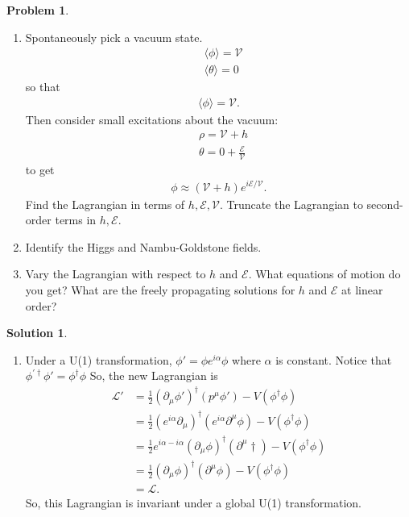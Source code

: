\documentclass[a4paper,11pt]{article}
\numberwithin{equation}{section}
\theoremstyle{definition}
\newtheorem{prob}{Problem}[section]
\newtheorem{sln}{Solution}[section]
\newcommand{\p}{\partial}
\newcommand{\lag}{\mathcal{L}}
\begin{document}
\begin{prob}
\begin{enumerate}
	\item Spontaneously pick a vacuum state. 
		\begin{align}
		&\langle \phi \rangle = \mathcal{V}\\
		&\langle \theta \rangle = 0
		\end{align}
		so that 
		\begin{align}
		\langle \phi \rangle = \mathcal{V}.
		\end{align}
		Then consider small excitations about the vacuum:
		\begin{align}
		&\rho= \mathcal{V} + h\\
		&\theta = 0 + \frac{\mathcal{E}}{\mathcal{V}}
		\end{align}
		to get
		\begin{align}
		\phi \approx (\mathcal{V} + h)e^{i\mathcal{E}/\mathcal{V}}.
		\end{align}
		Find the Lagrangian in terms of $h, \mathcal{E}, \mathcal{V}$. Truncate the Lagrangian to second-order terms in $h, \mathcal{E}$.\\
		
		
		
		\item Identify the Higgs and Nambu-Goldstone fields. \\
		
		
		\item Vary the Lagrangian with respect to $h$ and $\mathcal{E}$. What equations of motion do you get? What are the freely propagating solutions for $h$ and $\mathcal{E}$ at linear order?\\
		
	\end{enumerate}

	\begin{sln}
		$\,$
		\begin{enumerate}
			\item Under a U(1) transformation, $\phi' = \phi e^{i\alpha}\phi$ where $\alpha$ is constant. Notice that $\phi^{'\dagger}\phi' = \phi^\dagger\phi$ So, the new Lagrangian is
			\begin{align}
			\lag' &= \frac{1}{2}(\p_\mu\phi')^\dagger(p^\mu\phi') - V(\phi^\dagger\phi)\\
			&= \frac{1}{2}\left(e^{i\alpha}\p_\mu\right)^\dagger(e^{i\alpha}\p^\mu\phi) - V(\phi^\dagger\phi)\\
			&= \frac{1}{2}e^{i\alpha - i\alpha}(\p_\mu\phi)^\dagger(\p^\mu\dagger) - V(\phi^\dagger\phi)\\
			&= \frac{1}{2}(\p_\mu\phi)^\dagger(\p^\mu\phi) - V(\phi^\dagger\phi)\\
			&= \lag.
			\end{align}
			So, this Lagrangian is invariant under a global U(1) transformation.\\
			

\end{enumerate}
\end{sln}
\end{prob}
\end{document}

